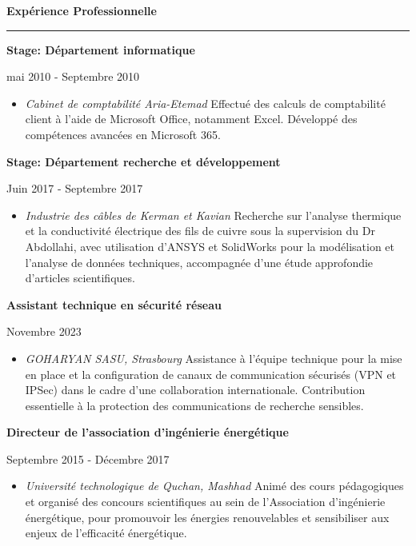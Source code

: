\documentclass[a4paper]{letter}
\newcommand{\divider}{\rule{\linewidth}{0.9pt}}
\begin{document}
\begin{minipage}[t]{0.67\textwidth}
{\large \textbf{Expérience Professionnelle}}
\divider
    

\vspace{1mm}
{\textbf{Stage: Département informatique}}

{\footnotesize mai 2010 - Septembre 2010}
\begin{itemize}
    \footnotesize \item \textit{Cabinet de comptabilité Aria-Etemad}
   \newline
    Effectué des calculs de comptabilité client à l’aide de Microsoft Office, notamment Excel. Développé des compétences avancées en Microsoft 365.
\end{itemize}


\vspace{3mm}
{\textbf{Stage: Département recherche et développement}}

{\footnotesize Juin 2017 - Septembre 2017}
\begin{itemize}
    \footnotesize \item \textit{Industrie des câbles de Kerman et Kavian}
   \newline
   Recherche sur l'analyse thermique et la conductivité électrique des fils de cuivre sous la supervision du Dr Abdollahi, avec utilisation d'ANSYS et SolidWorks pour la modélisation et l'analyse de données techniques, accompagnée d'une étude approfondie d'articles scientifiques.
\end{itemize}

\vspace{3mm}
{\textbf{Assistant technique en sécurité réseau}}

{\footnotesize Novembre 2023}
\begin{itemize}
   \footnotesize \item \textit{ GOHARYAN SASU, Strasbourg}
   \newline
   Assistance à l’équipe technique pour la mise en place et la configuration de canaux de communication sécurisés (VPN et IPSec) dans le cadre d’une collaboration internationale. Contribution essentielle à la protection des communications de recherche sensibles.
\end{itemize}

\vspace{3mm}
{\textbf{Directeur de l'association d'ingénierie énergétique}}

{\footnotesize Septembre 2015 - Décembre 2017}
\begin{itemize}
   \footnotesize \item \textit{Université technologique de Quchan, Mashhad}
   \newline
   Animé des cours pédagogiques et organisé des concours scientifiques au sein de l'Association d'ingénierie énergétique, pour promouvoir les énergies renouvelables et sensibiliser aux enjeux de l'efficacité énergétique.
\end{itemize}


\end{minipage}
\end{document}
